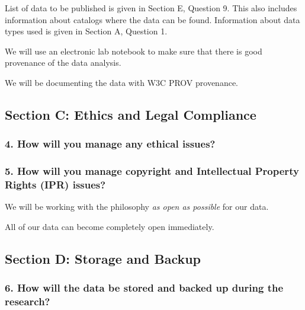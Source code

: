 \documentclass[
]{article}
\begin{document}
List of data to be published is given in Section E, Question 9. This
also includes information about catalogs where the data can be found.
Information about data types used is given in Section A, Question 1.

We will use an electronic lab notebook to make sure that there is good
provenance of the data analysis.

We will be documenting the data with W3C PROV provenance.

\hypertarget{sec-ethics-legal}{}
\hypertarget{section-c-ethics-and-legal-compliance}{%
\subsection{Section C: Ethics and Legal
Compliance}\label{section-c-ethics-and-legal-compliance}}

\hypertarget{q-ethical-issues}{}
\hypertarget{how-will-you-manage-any-ethical-issues}{%
\subsubsection{4. How will you manage any ethical
issues?}\label{how-will-you-manage-any-ethical-issues}}

\hypertarget{q-ethical-issues}{}
\hypertarget{how-will-you-manage-copyright-and-intellectual-property-rights-ipr-issues}{%
\subsubsection{5. How will you manage copyright and Intellectual
Property Rights (IPR)
issues?}\label{how-will-you-manage-copyright-and-intellectual-property-rights-ipr-issues}}

We will be working with the philosophy \emph{as open as possible} for
our data.

All of our data can become completely open immediately.

\hypertarget{sec-storage-backup}{}
\hypertarget{section-d-storage-and-backup}{%
\subsection{Section D: Storage and
Backup}\label{section-d-storage-and-backup}}

\hypertarget{q-store-backup}{}
\hypertarget{how-will-the-data-be-stored-and-backed-up-during-the-research}{%
\subsubsection{6. How will the data be stored and backed up during the
research?}\label{how-will-the-data-be-stored-and-backed-up-during-the-research}}
\end{document}
